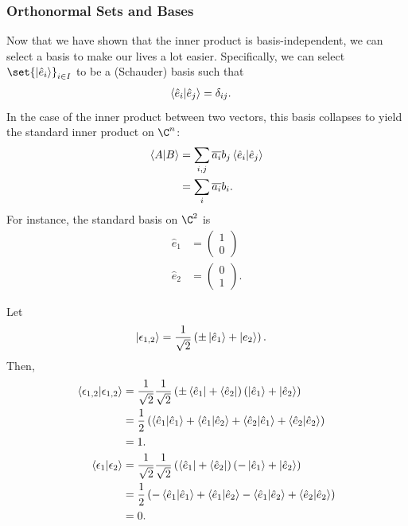 \documentclass[10pt]{mypackage}
\begin{document}
\subsubsection{Orthonormal Sets and Bases}%
Now that we have shown that the inner product is basis-independent, we can select a basis to make our lives a lot easier. Specifically, we can select $\set{\ket{\hat{e}_i}}_{i\in I}$ to be a (Schauder) basis such that
\begin{align*}
  \braket{\hat{e}_i}{\hat{e}_j} &= \delta_{ij}.
\end{align*}
In the case of the inner product between two vectors, this basis collapses to yield the standard inner product on $\C^n$:
\begin{align*}
  \braket{A}{B} &= \sum_{i,j}\overline{a_i}b_j \braket{\hat{e}_i}{\hat{e}_j}\\
                &= \sum_{i}\overline{a_i}b_i.
\end{align*}
For instance, the standard basis on $\C^2$ is
\begin{align*}
  \hat{e}_{1} &= \begin{pmatrix}1\\0\end{pmatrix}\\
  \hat{e}_{2} &= \begin{pmatrix}0\\1\end{pmatrix}.
\end{align*}
\begin{example}
Let
\begin{align*}
  \ket{\epsilon_{1,2}} &= \frac{1}{\sqrt{2}}\left(\pm \ket{\hat{e}_1} + \ket{e_2}\right).
\end{align*}
Then,
\begin{align*}
  \braket{\epsilon_{1,2}}{\epsilon_{1,2}} &= \frac{1}{\sqrt{2}}\frac{1}{\sqrt{2}}\left(\pm\bra{\hat{e}_1} + \bra{\hat{e}_2}\right)\left(\ket{\hat{e}_1} + \ket{\hat{e}_2}\right)\\
                                  &= \frac{1}{2}\left(\braket{\hat{e}_1}{\hat{e}_1} + \braket{\hat{e}_1}{\hat{e}_2} + \braket{\hat{e}_2}{\hat{e}_1} + \braket{\hat{e}_2}{\hat{e}_2}\right)\\
                                  &= 1.\\
  \braket{\epsilon_1}{\epsilon_2} &= \frac{1}{\sqrt{2}}\frac{1}{\sqrt{2}}\left(\bra{\hat{e}_1} + \bra{\hat{e}_2}\right)\left(-\ket{\hat{e}_1} + \ket{\hat{e}_2}\right)\\
                                  &= \frac{1}{2}\left(-\braket{\hat{e}_1}{\hat{e}_1} + \braket{\hat{e}_1}{\hat{e}_2} - \braket{\hat{e}_1}{\hat{e}_2} + \braket{\hat{e}_2}{\hat{e}_2}\right)\\
                                  &=0.
\end{align*}
\end{example}
\end{document}
